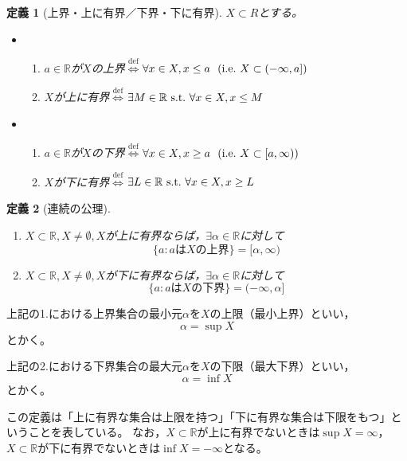 \documentclass[dvipdfmx,a4j,10pt]{jsarticle}
\theoremstyle{mystyle1}
\newtheorem{dfn}{定義}[part]
\theoremstyle{mystyle2}
\newcommand{\defLeftrightarrow}{\overset{\text{def}}{\iff}}
\begin{document}
\begin{framed}
    \begin{dfn}[上界・上に有界／下界・下に有界]
    	$X\subset R$とする。
    	\begin{itemize}
    	\item
    		\begin{enumerate}
    			\item $a\in \mathbb{R}$が$X$の上界$\defLeftrightarrow$$\forall x\in X,x\leq a\ \ ({\rm i.e.}\ X\subset(-\infty,a])$
    			\item $X$が上に有界$\defLeftrightarrow$$\exists M\in \mathbb{R}\ {\rm s.t.\ }\forall x\in X,x\leq M$
    		\end{enumerate}
    	\item
    		\begin{enumerate}
    			\item $a\in \mathbb{R}$が$X$の下界$\defLeftrightarrow$$\forall x\in X,x\geq a\ \ ({\rm i.e.}\ X\subset[a,\infty))$
    			\item $X$が下に有界$\defLeftrightarrow$$\exists L\in \mathbb{R}\ {\rm s.t.\ }\forall x\in X,x\geq L$
    		\end{enumerate}
    	\end{itemize}
    \end{dfn}
\end{framed}

\begin{framed}
    \begin{dfn}[連続の公理]\label{thm2.3}\
        \vspace{-\baselineskip}
        \begin{enumerate}
        	\item
        		$X\subset\mathbb{R},X\neq\emptyset,X$が上に有界ならば，$\exists\alpha\in\mathbb{R}$に対して
        		\[\{a:aはXの上界\}=[\alpha,\infty)\]
        	\item
        		$X\subset\mathbb{R},X\neq\emptyset,X$が下に有界ならば，$\exists\alpha\in\mathbb{R}$に対して
                \[\{a:aはXの下界\}=(-\infty,\alpha]\]
        \end{enumerate}
    \end{dfn}
\end{framed}

上記の1.における上界集合の最小元$\alpha$を$X$の上限（最小上界）といい，
\[\alpha=\sup X\]
とかく。
\par
上記の2.における下界集合の最大元$\alpha$を$X$の下限（最大下界）といい，
\[\alpha=\inf X\]
とかく。
\par
この定義は「上に有界な集合は上限を持つ」「下に有界な集合は下限をもつ」ということを表している。
なお，$X\subset\mathbb{R}$が上に有界でないときは$\sup X=\infty$，$X\subset\mathbb{R}$が下に有界でないときは$\inf X=-\infty$となる。\\
\end{document}
